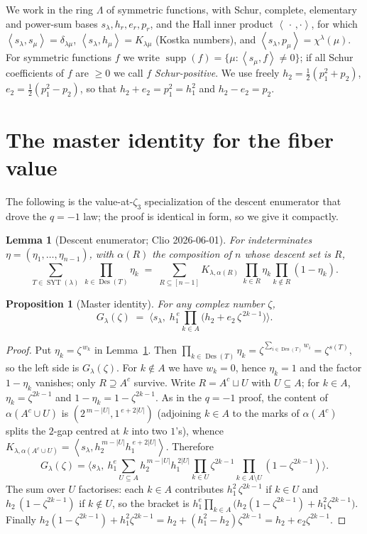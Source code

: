 \documentclass[11pt]{article}
\newtheorem{lemma}{Lemma}
\newtheorem{proposition}{Proposition}
\theoremstyle{definition}
\theoremstyle{remark}
\DeclareMathOperator{\Des}{Des}
\DeclareMathOperator{\SYT}{SYT}
\DeclareMathOperator{\supp}{supp}
\newcommand{\la}{\lambda}
\newcommand{\inner}[1]{\left\langle #1 \right\rangle}
\newcommand{\zt}{\zeta_3}
\begin{document}
We work in the ring $\Lambda$ of symmetric functions, with Schur, complete, elementary
and power-sum bases $s_\la,h_r,e_r,p_r$, and the Hall inner product
$\inner{\,\cdot\,,\cdot}$, for which $\inner{s_\la,s_\mu}=\delta_{\la\mu}$,
$\inner{s_\la,h_\mu}=K_{\la\mu}$ (Kostka numbers), and $\inner{s_\la,p_\mu}=\chi^\la(\mu)$.
For symmetric functions $f$ we write $\supp(f)=\{\mu:\inner{s_\mu,f}\neq0\}$; if all
Schur coefficients of $f$ are $\ge0$ we call $f$ \emph{Schur-positive}. We use freely
$h_2=\tfrac12(p_1^2+p_2)$, $e_2=\tfrac12(p_1^2-p_2)$, so that $h_2+e_2=p_1^2=h_1^2$ and
$h_2-e_2=p_2$.

\section{The master identity for the fiber value}

The following is the value-at-$\zt$ specialization of the descent enumerator that drove
the $q=-1$ law; the proof is identical in form, so we give it compactly.

\begin{lemma}[Descent enumerator; Clio 2026-06-01]\label{lem:descent}
For indeterminates $\eta=(\eta_1,\dots,\eta_{n-1})$, with $\alpha(R)$ the composition of
$n$ whose descent set is $R$,
\[
  \sum_{T\in\SYT(\la)}\ \prod_{k\in\Des(T)}\eta_k
   \;=\;\sum_{R\subseteq[n-1]} K_{\la,\alpha(R)}\ \prod_{k\in R}\eta_k\prod_{k\notin R}(1-\eta_k).
\]
\end{lemma}

\begin{proposition}[Master identity]\label{prop:master}
For any complex number $\zeta$,
\[
  G_\la(\zeta)\;=\;\Big\langle s_\la,\; h_1^{\,e}\prod_{k\in A}\big(h_2+e_2\,\zeta^{\,2k-1}\big)\Big\rangle .
\]
\end{proposition}

\begin{proof}
Put $\eta_k=\zeta^{\,w_k}$ in Lemma~\ref{lem:descent}. Then
$\prod_{k\in\Des(T)}\eta_k=\zeta^{\sum_{i\in\Des(T)}w_i}=\zeta^{s(T)}$, so the left side
is $G_\la(\zeta)$. For $k\notin A$ we have $w_k=0$, hence $\eta_k=1$ and the factor
$1-\eta_k$ vanishes; only $R\supseteq A^c$ survive. Write $R=A^c\sqcup U$ with
$U\subseteq A$; for $k\in A$, $\eta_k=\zeta^{2k-1}$ and $1-\eta_k=1-\zeta^{2k-1}$. As in
the $q=-1$ proof, the content of $\alpha(A^c\cup U)$ is $(2^{\,m-|U|},1^{\,e+2|U|})$
(adjoining $k\in A$ to the marks of $\alpha(A^c)$ splits the $2$-gap centred at $k$ into
two $1$'s), whence $K_{\la,\alpha(A^c\cup U)}=\inner{s_\la,h_2^{\,m-|U|}h_1^{\,e+2|U|}}$.
Therefore
\[
  G_\la(\zeta)=\Big\langle s_\la,\ h_1^{e}\sum_{U\subseteq A}
    h_2^{\,m-|U|}h_1^{\,2|U|}\prod_{k\in U}\zeta^{2k-1}\prod_{k\in A\setminus U}(1-\zeta^{2k-1})\Big\rangle .
\]
The sum over $U$ factorises: each $k\in A$ contributes $h_1^2\,\zeta^{2k-1}$ if $k\in U$
and $h_2\,(1-\zeta^{2k-1})$ if $k\notin U$, so the bracket is
$h_1^{e}\prod_{k\in A}\big(h_2(1-\zeta^{2k-1})+h_1^2\zeta^{2k-1}\big)$. Finally
$h_2(1-\zeta^{2k-1})+h_1^2\zeta^{2k-1}=h_2+(h_1^2-h_2)\zeta^{2k-1}=h_2+e_2\zeta^{2k-1}$.
\end{proof}
\end{document}
